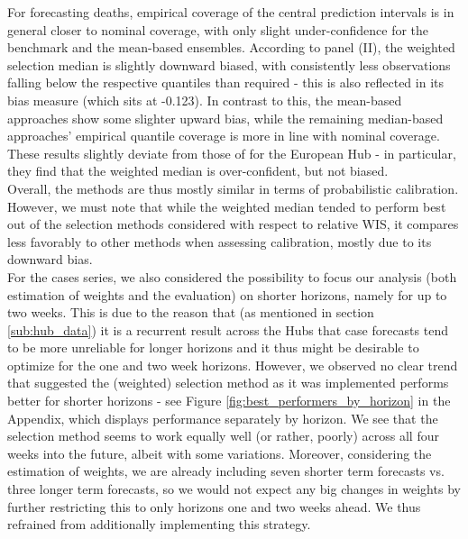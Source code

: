For forecasting deaths, empirical coverage of the central prediction intervals is in general closer to nominal coverage, with only slight under-confidence for the benchmark and the mean-based ensembles. According to panel (II), the weighted selection median is slightly downward biased, with consistently less observations falling below the respective quantiles than required - this is also reflected in its bias measure (which sits at -0.123). In contrast to this, the mean-based approaches show some slighter upward bias,  while the remaining median-based approaches' empirical quantile coverage is more in line with nominal coverage. These results slightly deviate from those of \cite{ray_comparing_2022} for the European Hub - in particular, they find that the weighted median is over-confident, but not biased. \\ %
Overall, the methods are thus mostly similar in terms of probabilistic calibration. However, we must note that while the weighted median tended to perform best out of the selection methods considered with respect to relative WIS, it compares less favorably to other methods when assessing calibration, mostly due to its downward bias. \medskip \\%
For the cases series, we also considered the possibility to focus our analysis (both estimation of weights and the evaluation) on shorter horizons, namely for up to two weeks. This is due to the reason that (as mentioned in section \ref{sub:hub_data}) it is a recurrent result across the Hubs that case forecasts tend to be more unreliable for longer horizons and it thus might be desirable to optimize for the one and two week horizons. However, we observed no clear trend that suggested the (weighted) selection method as it was implemented performs better for shorter horizons - see Figure \ref{fig:best_performers_by_horizon} in the Appendix, which displays performance separately by horizon. We see that the selection method seems to work equally well (or rather, poorly) across all four weeks into the future, albeit with some variations. Moreover, considering the estimation of weights, we are already including seven shorter term forecasts vs. three longer term forecasts, so we would not expect any big changes in weights by further restricting this to only horizons one and two weeks ahead. We thus refrained from additionally implementing this strategy. \medskip \\
